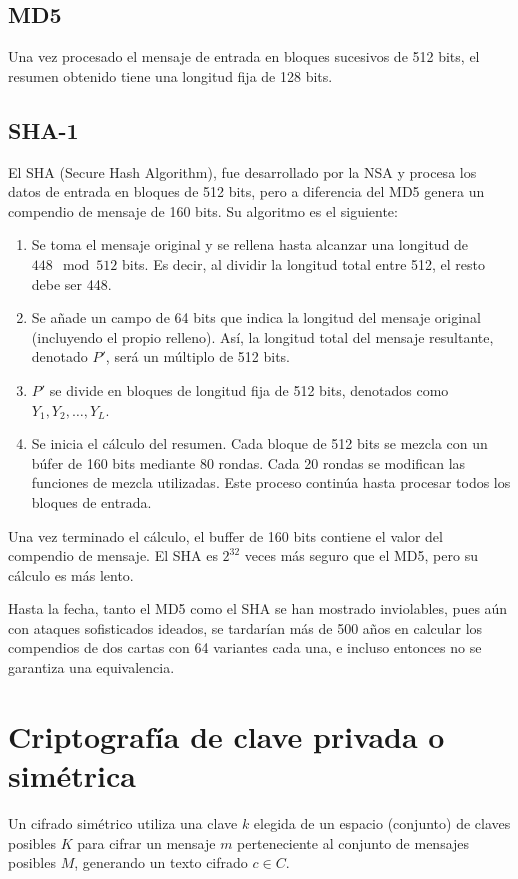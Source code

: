 \subsection{MD5}

Una vez procesado el mensaje de entrada en bloques sucesivos de 512 bits, el resumen obtenido tiene una longitud fija de 128 bits.

\subsection{SHA-1}
El SHA (Secure Hash Algorithm), fue desarrollado por la NSA y procesa los
datos de entrada en bloques de 512 bits, pero a diferencia del MD5 genera un
compendio de mensaje de 160 bits. Su algoritmo es el siguiente:
\begin{enumerate}
    \item Se toma el mensaje original y se rellena hasta alcanzar una longitud de $448 \mod 512$ bits. Es decir, al dividir la longitud total entre 512, el resto debe ser 448.
    \item Se añade un campo de 64 bits que indica la longitud del mensaje original (incluyendo el propio relleno). Así, la longitud total del mensaje resultante, denotado $P'$, será un múltiplo de 512 bits.
    \item $P'$ se divide en bloques de longitud fija de 512 bits, denotados como $Y_1, Y_2, \ldots, Y_L$.
    \item Se inicia el cálculo del resumen. Cada bloque de 512 bits se mezcla con un búfer de 160 bits mediante 80 rondas. Cada 20 rondas se modifican las funciones de mezcla utilizadas. Este proceso continúa hasta procesar todos los bloques de entrada.
\end{enumerate}

Una vez terminado el cálculo, el buffer de 160 bits contiene el valor del compendio de mensaje. El SHA es $2^{32}$ veces más seguro que el MD5, pero su cálculo es más lento.

Hasta la fecha, tanto el MD5 como el SHA se han mostrado inviolables, pues aún con ataques sofisticados ideados, se tardarían más de 500 años en calcular los compendios de dos cartas con 64 variantes cada una, e incluso entonces no se garantiza una equivalencia.

\section{Criptografía de clave privada o simétrica}
Un cifrado simétrico utiliza una clave $k$ elegida de un espacio (conjunto) de claves posibles $K$ para cifrar un mensaje $m$ perteneciente al conjunto de mensajes posibles $M$, generando un texto cifrado $c \in C$.

